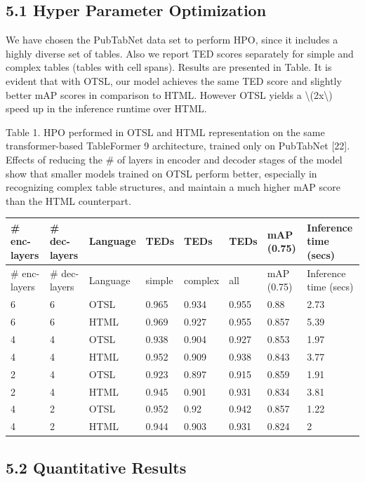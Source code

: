 \documentclass[11pt,a4paper]{article}
\begin{document}
\subsection{5.1 Hyper Parameter Optimization}

We have chosen the PubTabNet data set to perform HPO, since it includes a highly diverse set of tables. Also we report TED scores separately for simple and complex tables (tables with cell spans). Results are presented in Table. It is evident that with OTSL, our model achieves the same TED score and slightly better mAP scores in comparison to HTML. However OTSL yields a \textbackslash{}(2x\textbackslash{}) speed up in the inference runtime over HTML.

Table 1. HPO performed in OTSL and HTML representation on the same transformer-based TableFormer 9 architecture, trained only on PubTabNet [22]. Effects of reducing the \# of layers in encoder and decoder stages of the model show that smaller models trained on OTSL perform better, especially in recognizing complex table structures, and maintain a much higher mAP score than the HTML counterpart.

\begin{table}[h]
\begin{tabular}{|l|l|l|l|l|l|l|l|}
\hline
\# enc-layers & \# dec-layers & Language & TEDs & TEDs & TEDs & mAP (0.75) & Inference time (secs) \\ \hline
\# enc-layers & \# dec-layers & Language & simple & complex & all & mAP (0.75) & Inference time (secs) \\ \hline
6 & 6 & OTSL & 0.965 & 0.934 & 0.955 & 0.88 & 2.73 \\ \hline
6 & 6 & HTML & 0.969 & 0.927 & 0.955 & 0.857 & 5.39 \\ \hline
4 & 4 & OTSL & 0.938 & 0.904 & 0.927 & 0.853 & 1.97 \\ \hline
4 & 4 & HTML & 0.952 & 0.909 & 0.938 & 0.843 & 3.77 \\ \hline
2 & 4 & OTSL & 0.923 & 0.897 & 0.915 & 0.859 & 1.91 \\ \hline
2 & 4 & HTML & 0.945 & 0.901 & 0.931 & 0.834 & 3.81 \\ \hline
4 & 2 & OTSL & 0.952 & 0.92 & 0.942 & 0.857 & 1.22 \\ \hline
4 & 2 & HTML & 0.944 & 0.903 & 0.931 & 0.824 & 2 \\ \hline
\end{tabular}
\end{table}

\subsection{5.2 Quantitative Results}
\end{document}
